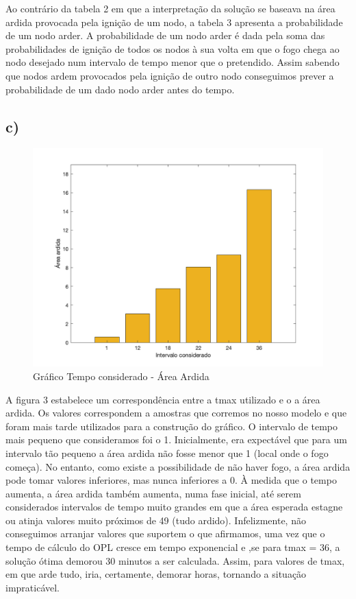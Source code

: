 \documentclass[11pt]{article} %
\begin{document}
Ao contrário da tabela 2 em que a interpretação da solução se baseava na área ardida provocada pela ignição de um nodo, a tabela 3 apresenta a probabilidade de um nodo arder. A probabilidade de um nodo arder é dada pela soma das probabilidades de ignição de todos os nodos à sua volta em que o fogo chega ao nodo desejado num intervalo de tempo menor que o pretendido. Assim sabendo que nodos ardem provocados pela ignição de outro nodo conseguimos prever a probabilidade de um dado nodo arder antes do tempo.
\newpage
\subsection*{c)}
\begin{figure}[h]
    \centering
    \includegraphics[scale=0.3]{graf3.png}
    \caption{Gráfico Tempo considerado - Área Ardida}
\end{figure}

A figura 3 estabelece um correspondência entre a tmax utilizado e o a área ardida. Os valores correspondem a amostras que corremos no nosso modelo e que foram mais tarde utilizados para a construção do gráfico. O intervalo de tempo mais pequeno que consideramos foi o 1. Inicialmente, era expectável que para um intervalo tão pequeno a área ardida não fosse menor que 1 (local onde o fogo começa). No entanto, como existe a possibilidade de não haver fogo, a área ardida pode tomar valores inferiores, mas nunca inferiores a 0. À medida que o tempo aumenta, a área ardida também aumenta, numa fase inicial, até serem considerados intervalos de tempo muito grandes em que a área esperada estagne ou atinja valores muito próximos de 49 (tudo ardido). Infelizmente, não conseguimos arranjar valores que suportem o que afirmamos, uma vez que o tempo de cálculo do OPL cresce em tempo exponencial e ,se para tmax = 36, a solução ótima demorou 30 minutos a ser calculada. Assim, para valores de tmax, em que arde tudo, iria, certamente, demorar horas, tornando a situação impraticável.
\end{document}
